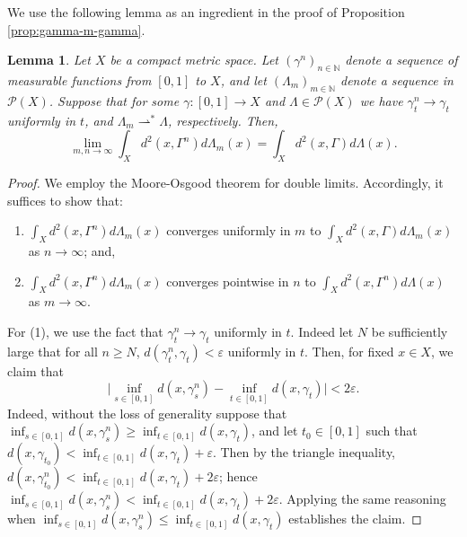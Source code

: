 \documentclass[aos, preprint]{imsart}
\theoremstyle{plain}
\newtheorem{lem}[theorem]{Lemma}
\theoremstyle{remark}
\begin{document}
\begin{appendix}
We use the following lemma as an ingredient in the proof of Proposition \ref{prop:gamma-m-gamma}.

\begin{lem}
  \label{lem:continuity-unpenalized-objective}Let $X$ be a compact
  metric space. Let $(\gamma^{n})_{n\in\mathbb{N}}$ denote a sequence
  of measurable functions from $[0,1]$ to $X$, and let
  $(\Lambda_{m})_{m\in\mathbb{N}}$ denote a sequence in
  $\mathcal{P}(X)$. Suppose that for some $\gamma:[0,1]\rightarrow X$
  and $\Lambda\in\mathcal{P}(X)$ we have
  $\gamma_{t}^{n}\rightarrow\gamma_{t}$ uniformly in $t$, and
  $\Lambda_{m}\rightharpoonup^{*}\Lambda$, respectively. Then,
  \[
    \lim_{m,n\rightarrow\infty} \int_{X} d^{2}(x,\Gamma^{n})
    d\Lambda_{m}(x) = \int_{X} d^{2}(x,\Gamma) d\Lambda(x).
  \]
\end{lem}

\begin{proof}
We employ the Moore-Osgood theorem for double limits. Accordingly,
it suffices to show that:
\begin{enumerate}
  \item $\int_{X}d^{2}(x,\Gamma^{n})d\Lambda_{m}(x)$ converges
    uniformly in $m$ to $\int_{X}d^{2}(x,\Gamma)d\Lambda_{m}(x)$ as
    $n\rightarrow\infty$; and,
  \item $\int_{X}d^{2}(x,\Gamma^{n})d\Lambda_{m}(x)$ converges
    pointwise in $n$ to $\int_{X}d^{2}(x,\Gamma^{n})d\Lambda(x)$ as
    $m\rightarrow\infty$.
\end{enumerate}
For (1), we use the fact that $\gamma_{t}^{n}\rightarrow\gamma_{t}$
uniformly in $t$. Indeed let $N$ be sufficiently large that for
  all $n \geq N$, $d(\gamma_{t}^{n},\gamma_{t})<\varepsilon$
uniformly in $t$. Then, for fixed $x\in X$,
we claim that
\[
   \Big| \inf_{s \in [0,1]} d(x,\gamma^{n}_s)-\inf_{
  t \in [0,1]}d(x,\gamma_{t})  \Big| < 2\varepsilon.
\]
Indeed, without the loss of generality suppose that
$\inf_{ s \in [0,1]} d(x,\gamma^{n}_{ s}) \geq
\inf_{ t \in [0,1]} d(x,\gamma_{t})$, and let
 $ t_0 \in [0,1]$ such that
$d(x, \gamma_{t_{0}}) < \inf_{ t \in [0,1]} d(x,\gamma_{t}) +
\varepsilon$. Then by the triangle inequality,
$d(x,\gamma_{t_{0}}^{n}) < \inf_{ t \in [0,1]} d(x,\gamma_{t}) +
2\varepsilon$; hence
$\inf_{ s \in [0,1]}d(x,\gamma^{n}_{ s}) < \inf_{ t \in
  [0,1]} d(x,\gamma_{t}) + 2\varepsilon$. Applying the same reasoning
when
$\inf_{ s \in [0,1]} d(x,\gamma^{n}_{ s}) \leq \inf_{ t \in
  [0,1]} d(x,\gamma_{t})$ establishes the claim.


\end{proof}
\end{appendix}
\end{document}
